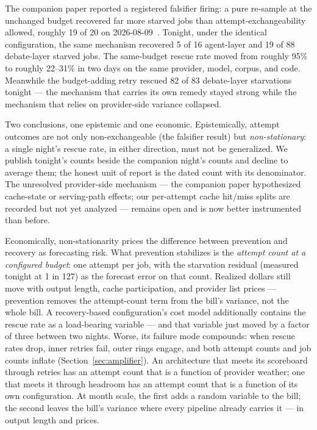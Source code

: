 \documentclass[11pt]{article}
\begin{document}
The companion paper reported a registered falsifier firing: a pure
re-sample at the unchanged budget recovered far more starved jobs than
attempt-exchangeability allowed, roughly 19 of 20 on
2026-08-09~\cite{reliability}. Tonight, under the identical
configuration, the same mechanism recovered 5 of 16 agent-layer and 19
of 88 debate-layer starved jobs. The same-budget rescue rate moved
from roughly 95\% to roughly 22--31\% in two days on the same
provider, model, corpus, and code. Meanwhile the budget-adding retry
rescued 82 of 83 debate-layer starvations tonight --- the mechanism
that carries its own remedy stayed strong while the mechanism that
relies on provider-side variance collapsed.

Two conclusions, one epistemic and one economic. Epistemically,
attempt outcomes are not only non-exchangeable (the falsifier result)
but \emph{non-stationary}: a single night's rescue rate, in either
direction, must not be generalized. We publish tonight's counts beside
the companion night's counts and decline to average them; the honest
unit of report is the dated count with its denominator. The unresolved
provider-side mechanism --- the companion paper hypothesized
cache-state or serving-path effects; our per-attempt cache hit/miss
splits are recorded but not yet analyzed --- remains open and is now
better instrumented than before.

Economically, non-stationarity prices the difference between
prevention and recovery as forecasting risk. What prevention
stabilizes is the \emph{attempt count at a configured budget}: one
attempt per job, with the starvation residual (measured tonight at 1
in 127) as the forecast error on that count. Realized dollars still
move with output length, cache participation, and provider list
prices --- prevention removes the attempt-count term from the bill's
variance, not the whole bill. A recovery-based configuration's cost
model additionally contains the rescue rate as a load-bearing
variable --- and that variable just
moved by a factor of three between two nights. Worse, its failure
mode compounds: when rescue rates drop, inner retries fail, outer
rings engage, and both attempt counts and job counts inflate
(Section~\ref{sec:amplifier}). An architecture that meets its
scoreboard through retries has an attempt count that is a function of
provider weather; one that meets it through headroom has an attempt
count that is a function of its own configuration. At month scale,
the first adds a random variable to the bill; the second leaves the
bill's variance where every pipeline already carries it --- in output
length and prices.
\end{document}
